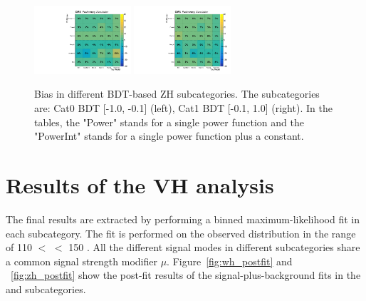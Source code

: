 \begin{figure}[!htb]
  \centering
  \captionsetup{justification=justified}
  \includegraphics[width=0.32\textwidth]{pics/VH_sec/Bias_study/pulls_ZH_BDT_n10_n01_signal_strength_1_table.pdf}
  \includegraphics[width=0.32\textwidth]{pics/VH_sec/Bias_study/pulls_ZH_BDT_n01_p10_signal_strength_1_table.pdf}
  \caption{Bias in different BDT-based ZH subcategories. The subcategories are: Cat0 BDT [-1.0, -0.1] (left), Cat1 BDT [-0.1, 1.0] (right). In the tables, the "Power" stands for a single power function and the "PowerInt" stands for a single power function plus a constant.}
  \label{fig:zh_bias_study}
\end{figure}



\clearpage
\section{Results of the VH analysis}\label{sec:vh_results}

The final results are extracted by performing a binned maximum-likelihood fit in each \VH subcategory.
The fit is performed on the observed \mmm distribution in the range of 110 $<$ \mmm $<$ 150 \GeV.
All the different signal modes in different subcategories share a common signal strength modifier $\mu$.
Figure~\ref{fig:wh_postfit} and ~\ref{fig:zh_postfit} show the post-fit results of the signal-plus-background fits in the \WH and \ZH subcategories.

